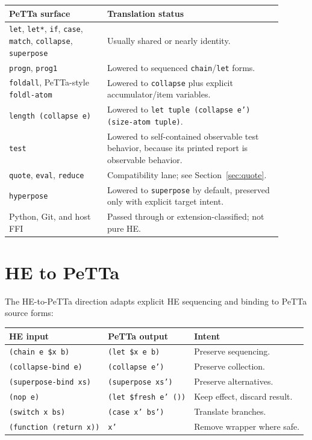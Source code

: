 \documentclass[11pt]{article}
\newcommand{\code}[1]{\texttt{#1}}
\newcommand{\HE}{\textup{HE}}
\newcommand{\PeTTa}{\textup{PeTTa}}
\begin{document}
\begin{longtable}{>{\raggedright\arraybackslash}p{0.32\linewidth}
                  >{\raggedright\arraybackslash}p{0.58\linewidth}}
\toprule
\PeTTa{} surface & Translation status \\
\midrule
\endhead
\code{let}, \code{let*}, \code{if}, \code{case}, \code{match},
\code{collapse}, \code{superpose} & Usually shared or nearly identity. \\
\code{progn}, \code{prog1} & Lowered to sequenced \code{chain}/\code{let}
forms. \\
\code{foldall}, \PeTTa{}-style \code{foldl-atom} & Lowered to
\code{collapse} plus explicit accumulator/item variables. \\
\code{length (collapse e)} & Lowered to \code{let tuple (collapse e')
(size-atom tuple)}. \\
\code{test} & Lowered to self-contained observable test behavior, because its
printed report is observable behavior. \\
\code{quote}, \code{eval}, \code{reduce} & Compatibility lane; see
Section~\ref{sec:quote}. \\
\code{hyperpose} & Lowered to \code{superpose} by default, preserved only with
explicit target intent. \\
Python, Git, and host FFI & Passed through or extension-classified; not pure
\HE{}. \\
\bottomrule
\end{longtable}

\section{\HE{} to \PeTTa{}}

The \HE{}-to-\PeTTa{} direction adapts explicit \HE{} sequencing and binding to
\PeTTa{} source forms:

\begin{center}
\begin{tabular}{lll}
\toprule
\HE{} input & \PeTTa{} output & Intent \\
\midrule
\code{(chain e \$x b)} & \code{(let \$x e b)} & Preserve sequencing. \\
\code{(collapse-bind e)} & \code{(collapse e')} & Preserve collection. \\
\code{(superpose-bind xs)} & \code{(superpose xs')} & Preserve alternatives. \\
\code{(nop e)} & \code{(let \$fresh e' ())} & Keep effect, discard result. \\
\code{(switch x bs)} & \code{(case x' bs')} & Translate branches. \\
\code{(function (return x))} & \code{x'} & Remove wrapper where safe. \\
\bottomrule
\end{tabular}
\end{center}
\end{document}
